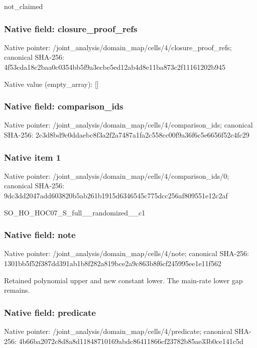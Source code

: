 \documentclass[10pt,a4paper]{article}
\begin{document}
\begingroup\raggedright\sloppy not\_\allowbreak{}claimed\par\endgroup

\subsubsection{Native field: closure\_\allowbreak{}proof\_\allowbreak{}refs}
Native pointer: /joint\_\allowbreak{}analysis/domain\_\allowbreak{}map/cells/4/closure\_\allowbreak{}proof\_\allowbreak{}refs; canonical SHA-256: 4f53cda18c2baa0c0354bb5f9a3ecbe5ed12ab4d8e11ba873c2f11161202b945

Native value (empty\_\allowbreak{}array): []

\subsubsection{Native field: comparison\_\allowbreak{}ids}
Native pointer: /joint\_\allowbreak{}analysis/domain\_\allowbreak{}map/cells/4/comparison\_\allowbreak{}ids; canonical SHA-256: 2c3d8bd9c0ddaebc8f3a2f2a7487a1fa2c558cc00f9a36f6c5e6656f52c4fc29

\subsubsection{Native item 1}
Native pointer: /joint\_\allowbreak{}analysis/domain\_\allowbreak{}map/cells/4/comparison\_\allowbreak{}ids/0; canonical SHA-256: 9dc3dd2047add603820b5ab261b1915d6346545c775dcc256af809551e12c2af

\begingroup\raggedright\sloppy SO\_\allowbreak{}HO\_\allowbreak{}HOC07\_\allowbreak{}S\_\allowbreak{}full\_\allowbreak{}\_\allowbreak{}randomized\_\allowbreak{}\_\allowbreak{}c1\par\endgroup

\subsubsection{Native field: note}
Native pointer: /joint\_\allowbreak{}analysis/domain\_\allowbreak{}map/cells/4/note; canonical SHA-256: 1301bb5f52f387dd391ab1b8f282a819bce2a9c863b8f6cf245995ee1e11f562

\begingroup\raggedright\sloppy Retained polynomial upper and new constant lower. The main-rate lower gap remains.\par\endgroup

\subsubsection{Native field: predicate}
Native pointer: /joint\_\allowbreak{}analysis/domain\_\allowbreak{}map/cells/4/predicate; canonical SHA-256: 4b66ba2072c8d8a8d11848710169abdc86411866cf23782b85ae33b0ce141c5d
\end{document}

